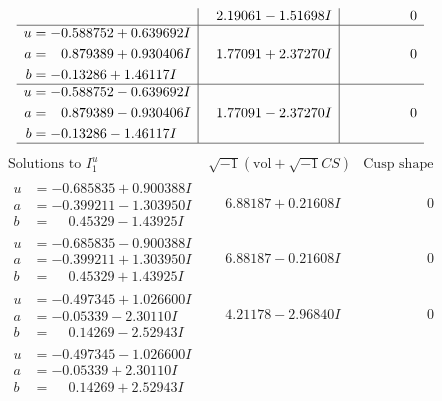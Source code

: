 \documentclass[1p]{elsarticle_modified}
\theoremstyle{definition}
\newcommand{\I}{\sqrt{-1}}
\begin{document}
$$\begin{array}{c|c|c}
 & \phantom{-}2.19061 - 1.51698 I & \phantom{-0.000000 } 0 \\ \hline\begin{aligned}
u &= -0.588752 + 0.639692 I \\
a &= \phantom{-}0.879389 + 0.930406 I \\
b &= -0.13286 + 1.46117 I\end{aligned}
 & \phantom{-}1.77091 + 2.37270 I & \phantom{-0.000000 } 0 \\ \hline\begin{aligned}
u &= -0.588752 - 0.639692 I \\
a &= \phantom{-}0.879389 - 0.930406 I \\
b &= -0.13286 - 1.46117 I\end{aligned}
 & \phantom{-}1.77091 - 2.37270 I & \phantom{-0.000000 } 0\\
 \hline 
 \end{array}$$\newpage$$\begin{array}{c|c|c}  
\text{Solutions to }I^u_{1}& \I (\text{vol} + \sqrt{-1}CS) & \text{Cusp shape}\\
 \hline 
\begin{aligned}
u &= -0.685835 + 0.900388 I \\
a &= -0.399211 - 1.303950 I \\
b &= \phantom{-}0.45329 - 1.43925 I\end{aligned}
 & \phantom{-}6.88187 + 0.21608 I & \phantom{-0.000000 } 0 \\ \hline\begin{aligned}
u &= -0.685835 - 0.900388 I \\
a &= -0.399211 + 1.303950 I \\
b &= \phantom{-}0.45329 + 1.43925 I\end{aligned}
 & \phantom{-}6.88187 - 0.21608 I & \phantom{-0.000000 } 0 \\ \hline\begin{aligned}
u &= -0.497345 + 1.026600 I \\
a &= -0.05339 - 2.30110 I \\
b &= \phantom{-}0.14269 - 2.52943 I\end{aligned}
 & \phantom{-}4.21178 - 2.96840 I & \phantom{-0.000000 } 0 \\ \hline\begin{aligned}
u &= -0.497345 - 1.026600 I \\
a &= -0.05339 + 2.30110 I \\
b &= \phantom{-}0.14269 + 2.52943 I\end{aligned}

\end{array}$$
\end{document}
